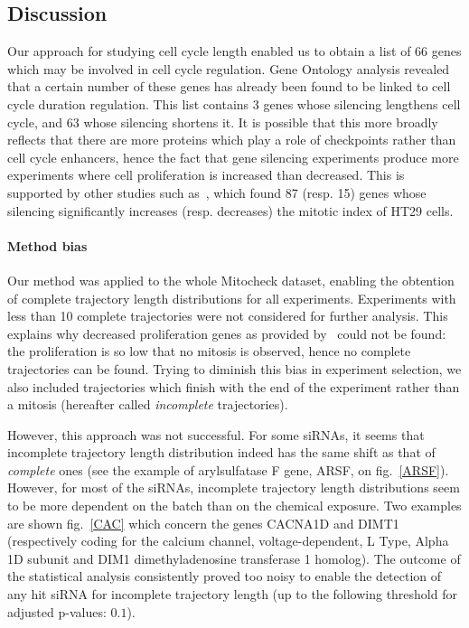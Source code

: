 \subsection{Discussion}
Our approach for studying cell cycle length enabled us to obtain a list of 66 genes which may be involved in cell cycle regulation. Gene Ontology analysis revealed that a certain number of these genes has already been found to be linked to cell cycle duration regulation. This list contains 3 genes whose silencing lengthens cell cycle, and 63 whose silencing shortens it. It is possible that this more broadly reflects that there are more proteins which play a role of checkpoints rather than cell cycle enhancers, hence the fact that gene silencing experiments produce more experiments where cell proliferation is increased than decreased. This is supported by other studies such as~\cite{pmid16564017}, which found 87 (resp. 15) genes whose silencing significantly increases (resp. decreases) the mitotic index of HT29 cells.

\paragraph*{Method bias\\}
Our method was applied to the whole Mitocheck dataset, enabling the obtention of complete trajectory length distributions for all experiments. Experiments with less than 10 complete trajectories were not considered for further analysis. This explains why decreased proliferation genes as provided by~\cite{pmid20360735} could not be found: the proliferation is so low that no mitosis is observed, hence no complete trajectories can be found. Trying to diminish this bias in experiment selection, we also included trajectories which finish with the end of the experiment rather than a mitosis (hereafter called \textit{incomplete} trajectories). 

However, this approach was not successful. For some siRNAs, it seems that incomplete trajectory length distribution indeed has the same shift as that of \textit{complete} ones (see the example of arylsulfatase F gene, ARSF, on fig.~\ref{ARSF}). However, for most of the siRNAs, incomplete trajectory length distributions seem to be more dependent on the batch than on the chemical exposure. Two examples are shown fig.~\ref{CAC} which concern the genes CACNA1D and DIMT1 (respectively coding for the calcium channel, voltage-dependent, L Type, Alpha 1D subunit and DIM1 dimethyladenosine transferase 1 homolog). The outcome of the statistical analysis consistently proved too noisy to enable the detection of any hit siRNA for incomplete trajectory length (up to the following threshold for adjusted p-values: $0.1$).

